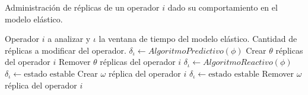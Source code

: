 \begin{algorithm}[!ht]
	\caption{Administraci\'on de r\'eplicas de un operador $i$ dado su comportamiento en el modelo el\'astico.}
	\label{alg:administracion}
	\begin{algorithmic}[1]
	\REQUIRE Operador $i$ a analizar y $\iota$ la ventana de tiempo del modelo el\'astico.
	\ENSURE Cantidad de r\'eplicas a modificar del operador.	
		\STATE $\delta_{\iota} \leftarrow AlgoritmoPredictivo(\phi)$
				\RETURN Crear $\theta$ r\'eplicas del operador $i$
			\ENDIF
			\RETURN Remover $\theta$ r\'eplicas del operador $i$
		\ENDIF
	\ELSE[$\iota$ es $T_r$]
		\STATE $\delta_{\iota} \leftarrow AlgoritmoReactivo(\phi)$
				\STATE $\delta_{\iota} \leftarrow \text{estado estable}$ 
				\RETURN Crear $\omega$ r\'eplica del operador $i$
			\ENDIF
			\STATE $\delta_{\iota} \leftarrow \text{estado estable}$ 
			\RETURN Remover $\omega$ r\'eplica del operador $i$
		\ENDIF 
	\ENDIF	
	\end{algorithmic}
\end{algorithm}